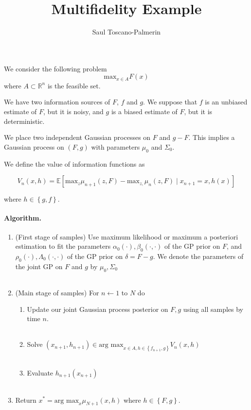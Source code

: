 \documentclass[12pt,english]{article}
\author{Saul Toscano-Palmerin}
\date{}
\begin{document}
\title{Multifidelity Example}

\maketitle
We consider the following problem
\[
\mbox{max}_{x\in A}F\left(x\right)
\]
where $A\subset\mathbb{R}^{n}$ is the feasible set.

We have two information sources of $F$, $f$ and $g$. We suppose that $f$
is an unbiased estimate of $F$, but it is noisy, and $g$ is a biased
estimate of $F$, but it is deterministic.

We place two independent Gaussian processes on $F$ and $g-F$. This implies a Gaussian process
on $(F,g)$ with parameters $\mu_{0}$ and $\Sigma_{0}$.

We define the value of information functions as

\[
V_{n}\left(x,h\right)=\mathbb{E}\left[\mbox{max}_{z}\mu_{n+1}\left(z,F\right)-\mbox{max}_{z,}\mu_{n}\left(z,F\right)\mid x_{n+1}=x,h\left(x\right)\right]
\]

where $h\in\left\{ g,f\right\} $.


\paragraph{Algorithm.}

\begin{enumerate}
\item (First stage of samples) Use maximum likelihood or maximum a posteriori estimation to fit the
parameters $\alpha_{0}\left(\cdot\right),\beta_{0}\left(\cdot,\cdot\right)$
of the GP prior on $F$, and $\rho_{0}\left(\cdot\right),\Lambda_{0}\left(\cdot,\cdot\right)$
of the GP prior on $\delta=F-g$. We denote the parameters of the joint GP on $F$ and $g$ by
$\mu_{0},\Sigma_{0}$\\
 \textrm{}\\
\item (Main stage of samples) For $n\leftarrow1$ to $N$ do
\begin{enumerate}
    \item Update our joint Gaussian process posterior on $F,g$ using all samples by time $n$.\\
    \textrm{}\\
\item Solve $\left(x_{n+1},h_{n+1}\right)\in\mbox{arg max}_{x\in A,h\in\left\{ f_{n+1},g\right\} }V_{n}\left(x,h\right)$\\
\textrm{}\\
\item Evaluate $h_{n+1}\left(x_{n+1}\right)$\\
\textrm{}\\
\end{enumerate}
\item Return $x^{*}=\mbox{arg max}_{x}\mu_{N+1}\left(x,h\right)$ where $h\in\left\{ F,g\right\}$.
\end{enumerate}
\end{document}
